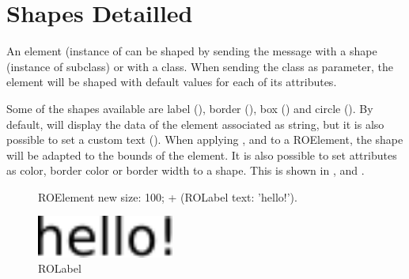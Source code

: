 \documentclass[a4paper,10pt,twoside]{book}
\begin{document}
\section{Shapes Detailled} 

An element (instance of  can be shaped by sending the \ct{+} message with a shape (instance of  subclass) or with a  class. When sending the class as parameter, the element will be shaped with default values for each of its attributes. 

Some of the shapes available are label (), border (), box () and circle (). By default,  will display the data of the element associated as string, but it is also possible to set a custom text ().  When applying ,  and  to a ROElement, the shape will be adapted to the bounds of the element. It is also possible to set attributes as color, border color or border width to a shape. This is shown in ,  and .


\begin{figure}[H]
      \begin{minipage}[t]{0.5\textwidth}
      \vspace{0pt}
     \begin{code}
     
	ROElement new 
		size: 100; 
		+ (ROLabel text: 'hello!').	\end{code}
   \end{minipage}
   \hfill
   \begin{minipage}[t]{0.4\textwidth}
      \vspace{0pt} \raggedright
       \centering
		\includegraphics[width=0.4\textwidth]{label}
   \end{minipage}
\caption{ROLabel}
\label{fig:label}
\end{figure}
\end{document}
